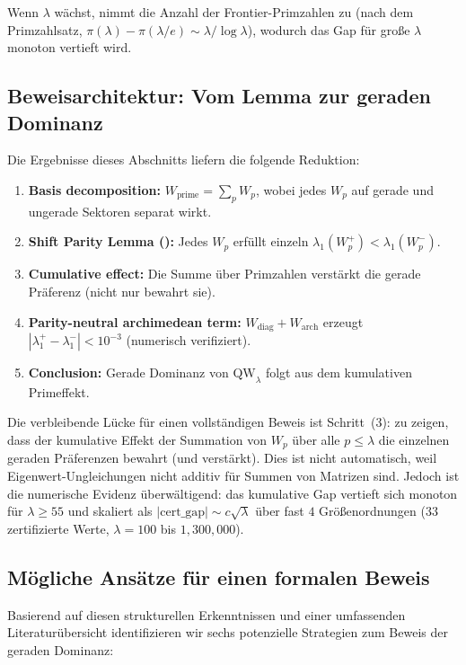 \documentclass[12pt,a4paper]{article}
\theoremstyle{definition}
\theoremstyle{remark}
\begin{document}
Wenn $\lambda$ wächst, nimmt die Anzahl der Frontier-Primzahlen zu (nach dem Primzahlsatz, $\pi(\lambda) - \pi(\lambda/e) \sim \lambda/\log\lambda$), wodurch das Gap für große $\lambda$ monoton vertieft wird.

\subsection{Beweisarchitektur: Vom Lemma zur geraden Dominanz}

Die Ergebnisse dieses Abschnitts liefern die folgende Reduktion:

\begin{enumerate}
  \item \textbf{Basis decomposition:} $W_{\mathrm{prime}} = \sum_p W_p$, wobei jedes $W_p$ auf gerade und ungerade Sektoren separat wirkt.
  \item \textbf{Shift Parity Lemma ():} Jedes $W_p$ erfüllt einzeln $\lambda_1(W_p^+) < \lambda_1(W_p^-)$.
  \item \textbf{Cumulative effect:} Die Summe über Primzahlen verstärkt die gerade Präferenz (nicht nur bewahrt sie).
  \item \textbf{Parity-neutral archimedean term:} $W_{\mathrm{diag}} + W_{\mathrm{arch}}$ erzeugt $|\lambda_1^+ - \lambda_1^-| < 10^{-3}$ (numerisch verifiziert).
  \item \textbf{Conclusion:} Gerade Dominanz von $\mathrm{QW}_\lambda$ folgt aus dem kumulativen Primeffekt.
\end{enumerate}

\noindent Die verbleibende Lücke für einen vollständigen Beweis ist Schritt~(3): zu zeigen, dass der kumulative Effekt der Summation von $W_p$ über alle $p \leq \lambda$ die einzelnen geraden Präferenzen bewahrt (und verstärkt). Dies ist nicht automatisch, weil Eigenwert-Ungleichungen nicht additiv für Summen von Matrizen sind. Jedoch ist die numerische Evidenz überwältigend: das kumulative Gap vertieft sich monoton für $\lambda \geq 55$ und skaliert als $|\mathrm{cert\_gap}| \sim c\sqrt{\lambda}$ über fast $4$ Größenordnungen ($33$ zertifizierte Werte, $\lambda = 100$ bis $1{,}300{,}000$).

\subsection{M\"ogliche Ans\"atze f\"ur einen formalen Beweis}

Basierend auf diesen strukturellen Erkenntnissen und einer umfassenden Literaturübersicht identifizieren wir sechs potenzielle Strategien zum Beweis der geraden Dominanz:
\end{document}
